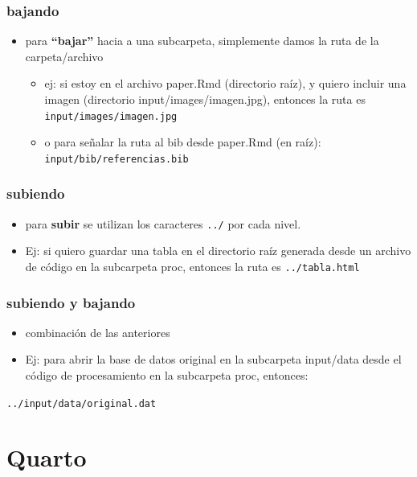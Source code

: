 \documentclass[
  letterpaper,
  DIV=11,
  numbers=noendperiod]{scrartcl}
\begin{document}
\subsubsection{bajando}\label{bajando}

\begin{itemize}
\item
  para \textbf{``bajar''} hacia a una subcarpeta, simplemente damos la
  ruta de la carpeta/archivo

  \begin{itemize}
  \item
    ej: si estoy en el archivo paper.Rmd (directorio raíz), y quiero
    incluir una imagen (directorio input/images/imagen.jpg), entonces la
    ruta es \texttt{input/images/imagen.jpg}
  \item
    o para señalar la ruta al bib desde paper.Rmd (en raíz):
    \texttt{input/bib/referencias.bib}
  \end{itemize}
\end{itemize}

\subsubsection{subiendo}\label{subiendo}

\begin{itemize}
\item
  para \textbf{subir} se utilizan los caracteres \texttt{../} por cada
  nivel.
\item
  Ej: si quiero guardar una tabla en el directorio raíz generada desde
  un archivo de código en la subcarpeta proc, entonces la ruta es
  \texttt{../tabla.html}
\end{itemize}

\subsubsection{subiendo y bajando}\label{subiendo-y-bajando}

\begin{itemize}
\item
  combinación de las anteriores
\item
  Ej: para abrir la base de datos original en la subcarpeta input/data
  desde el código de procesamiento en la subcarpeta proc, entonces:
\end{itemize}

\texttt{../input/data/original.dat}

\section{Quarto}\label{quarto}
\end{document}
